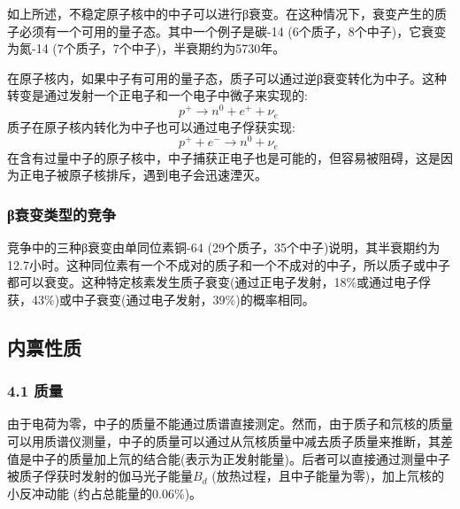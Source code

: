 如上所述，不稳定原子核中的中子可以进行β衰变。在这种情况下，衰变产生的质子必须有一个可用的量子态。其中一个例子是碳-14 (6个质子，8个中子)，它衰变为氮-14 (7个质子，7个中子)，半衰期约为5730年。

在原子核内，如果中子有可用的量子态，质子可以通过逆β衰变转化为中子。这种转变是通过发射一个正电子和一个电子中微子来实现的:
$$p^+ \rightarrow n^0 + e^+ + \nu_e~$$
质子在原子核内转化为中子也可以通过电子俘获实现:
$$p^+ + e^- \rightarrow n^0 + \nu_e~$$
在含有过量中子的原子核中，中子捕获正电子也是可能的，但容易被阻碍，这是因为正电子被原子核排斥，遇到电子会迅速湮灭。

\subsubsection{β衰变类型的竞争}
竞争中的三种β衰变由单同位素铜-64 (29个质子，35个中子)说明，其半衰期约为12.7小时。这种同位素有一个不成对的质子和一个不成对的中子，所以质子或中子都可以衰变。这种特定核素发生质子衰变(通过正电子发射，18\%或通过电子俘获，43\%)或中子衰变(通过电子发射，39\%)的概率相同。

\subsection{内禀性质}
\subsubsection{4.1 质量}
由于电荷为零，中子的质量不能通过质谱直接测定。然而，由于质子和氘核的质量可以用质谱仪测量，中子的质量可以通过从氘核质量中减去质子质量来推断，其差值是中子的质量加上氘的结合能(表示为正发射能量)。后者可以直接通过测量中子被质子俘获时发射的伽马光子能量$B_d$ (放热过程，且中子能量为零)，加上氘核的小反冲动能  (约占总能量的0.06\%)。














